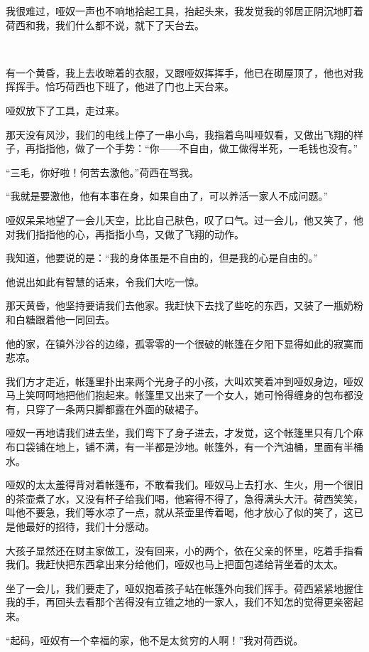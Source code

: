 \par 我很难过，哑奴一声也不响地拾起工具，抬起头来，我发觉我的邻居正阴沉地盯着荷西和我，我们什么都不说，就下了天台去。
\par  
\par 有一个黄昏，我上去收晾着的衣服，又跟哑奴挥挥手，他已在砌屋顶了，他也对我挥挥手。恰巧荷西也下班了，他进了门也上天台来。
\par 哑奴放下了工具，走过来。
\par 那天没有风沙，我们的电线上停了一串小鸟，我指着鸟叫哑奴看，又做出飞翔的样子，再指指他，做了一个手势：“你——不自由，做工做得半死，一毛钱也没有。”
\par “三毛，你好啦！何苦去激他。”荷西在骂我。
\par “我就是要激他，他有本事在身，如果自由了，可以养活一家人不成问题。”
\par 哑奴呆呆地望了一会儿天空，比比自己肤色，叹了口气。过一会儿，他又笑了，他对我们指指他的心，再指指小鸟，又做了飞翔的动作。
\par 我知道，他要说的是：“我的身体虽是不自由的，但是我的心是自由的。”
\par 他说出如此有智慧的话来，令我们大吃一惊。
\par 那天黄昏，他坚持要请我们去他家。我赶快下去找了些吃的东西，又装了一瓶奶粉和白糖跟着他一同回去。
\par 他的家，在镇外沙谷的边缘，孤零零的一个很破的帐篷在夕阳下显得如此的寂寞而悲凉。
\par 我们方才走近，帐篷里扑出来两个光身子的小孩，大叫欢笑着冲到哑奴身边，哑奴马上笑呵呵地把他们抱起来。帐篷里又出来了一个女人，她可怜得缠身的包布都没有，只穿了一条两只脚都露在外面的破裙子。
\par 哑奴一再地请我们进去坐，我们弯下了身子进去，才发觉，这个帐篷里只有几个麻布口袋铺在地上，铺不满，有一半都是沙地。帐篷外，有一个汽油桶，里面有半桶水。
\par 哑奴的太太羞得背对着帐篷布，不敢看我们。哑奴马上去打水、生火，用一个很旧的茶壶煮了水，又没有杯子给我们喝，他窘得不得了，急得满头大汗。荷西笑笑，叫他不要急，我们等水凉了一点，就从茶壶里传着喝，他才放心了似的笑了，这已是他最好的招待，我们十分感动。
\par 大孩子显然还在财主家做工，没有回来，小的两个，依在父亲的怀里，吃着手指看我们。我赶快把东西拿出来分给他们，哑奴也马上把面包递给背坐着的太太。
\par 坐了一会儿，我们要走了，哑奴抱着孩子站在帐篷外向我们挥手。荷西紧紧地握住我的手，再回头去看那个苦得没有立锥之地的一家人，我们不知怎的觉得更亲密起来。
\par “起码，哑奴有一个幸福的家，他不是太贫穷的人啊！”我对荷西说。
